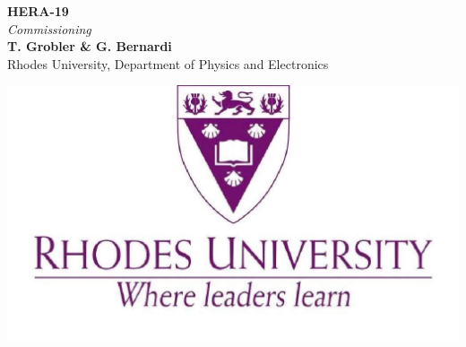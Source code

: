 \documentclass[a0,portrait]{a0poster}
\begin{document}


\begin{minipage}[b]{0.75\linewidth}
\veryHuge \color{NavyBlue} \textbf{HERA-19} \color{Black}\\ %
\Huge\textit{Commissioning}\\[2cm] %
\huge \textbf{T. Grobler \& G. Bernardi}\\[0.5cm] %
\huge Rhodes University, Department of Physics and Electronics\\[0.4cm] %
\end{minipage}
%
\begin{minipage}[b]{0.25\linewidth}
\includegraphics[width=20cm]{Rhodes_logo.jpg}\\
\end{minipage}

\vspace{1cm} %

\end{document}
